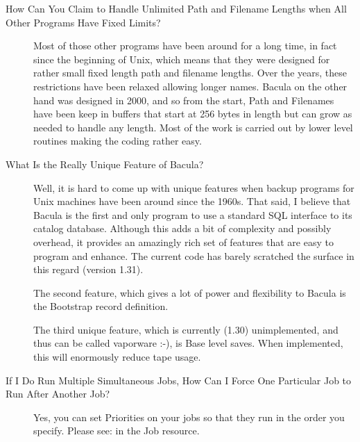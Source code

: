 \begin{description}
\label{filenamelengths}
\item [How Can You Claim to Handle Unlimited Path and Filename Lengths
   when  All Other Programs Have Fixed Limits?]
    Most of those
   other programs have been around for a long time, in fact since the
   beginning of Unix, which means that they were designed for rather small
   fixed length path and filename lengths.  Over the years, these
   restrictions have been relaxed allowing longer names.  Bacula on the
   other hand was designed in 2000, and so from the start, Path and
   Filenames have been keep in buffers that start at 256 bytes in length
   but can grow as needed to handle any length.  Most of the work is
   carried out by lower level routines making the coding rather easy.

\label{unique}
\item [What Is the Really Unique Feature of Bacula?   ]
    Well, it
   is hard to come up with unique features when backup programs for Unix
   machines have been around since the 1960s.  That said, I believe that
   Bacula is the first and only program to use a standard SQL interface to
   its catalog database.  Although this adds a bit of complexity and
   possibly overhead, it provides an amazingly rich set of features that
   are easy to program and enhance.  The current code has barely scratched
   the surface in this regard (version 1.31).

   The second feature, which gives a lot of power and flexibility to Bacula
   is the Bootstrap record definition.

   The third unique feature, which is currently (1.30) unimplemented, and
   thus can be called vaporware :-), is Base level saves.  When
   implemented, this will enormously reduce tape usage.

\label{sequence}

\item [If I Do Run Multiple Simultaneous Jobs, How Can I Force One
   Particular  Job to Run After Another Job? ]
Yes, you can set Priorities on your jobs so that they  run in the order you
specify. Please see:  
 in the  Job resource.

\label{nomail}


\end{description}
